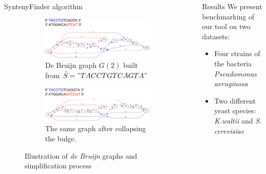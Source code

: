 \documentclass[final,hyperref={pdfpagelabels=false}]{beamer}
\begin{document}
\begin{frame}{}
\begin{columns}[t]
\begin{column}{0.32\linewidth}
\begin{block}{SyntenyFinder algorithm}
\begin{figure}
        \begin{subfigure}[a]{1\textwidth}
		\centering
		\includegraphics[scale = 0.75]{graph1.pdf}
		\justifying
		\small \caption{De Bruijn graph \(G(2)\) built from \(\hat{S} = "TACCTGTCAGTA"\)}
		\label{DeBruijnA}
        \end{subfigure}
        \begin{subfigure}[b]{1\textwidth}
		\centering
		\includegraphics[scale = 0.75]{graph2.pdf}
		\small \caption{The same graph after collapsing the bulge.}
		\label{DeBruijnB}
        \end{subfigure}
	\small \caption{Illustration of \textit{de Bruijn} graphs and simplification process}
\end{figure}

\end{block}

\end{column}

\begin{column}{0.32\linewidth}

\begin{block}{Results} \justifying
We present benchmarking of our tool on two datasets:
\begin{itemize}
\item Four strains of the bacteria \textit{Pseudomonas aeruginosa}
\item Two different yeast species: \textit{K.waltii} and \textit{S. cerevisiae}
\end{itemize}


\end{block}
\end{column}
\end{columns}
\end{frame}
\end{document}
